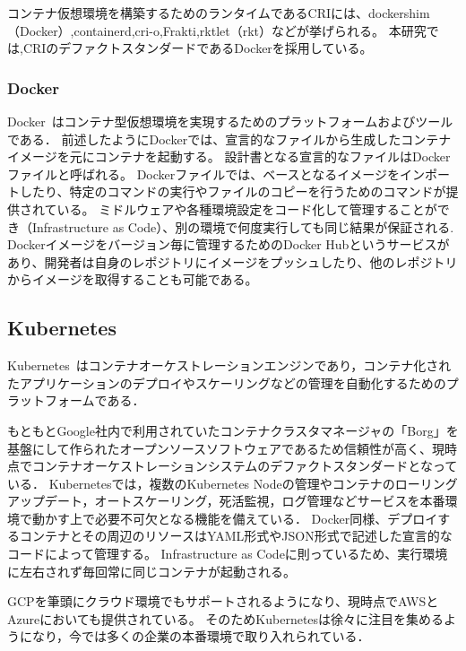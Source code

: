 コンテナ仮想環境を構築するためのランタイムであるCRIには、dockershim（Docker）,containerd,cri-o,Frakti,rktlet（rkt）などが挙げられる。
本研究では,CRIのデファクトスタンダードであるDockerを採用している。

\subsubsection{Docker}
\label{background:docker}

Docker~\cite{Docker}はコンテナ型仮想環境を実現するためのプラットフォームおよびツールである．
前述したようにDockerでは、宣言的なファイルから生成したコンテナイメージを元にコンテナを起動する。
設計書となる宣言的なファイルはDockerファイルと呼ばれる。
Dockerファイルでは、ベースとなるイメージをインポートしたり、特定のコマンドの実行やファイルのコピーを行うためのコマンドが提供されている。
ミドルウェアや各種環境設定をコード化して管理することができ（Infrastructure as Code）、別の環境で何度実行しても同じ結果が保証される.
Dockerイメージをバージョン毎に管理するためのDocker Hubというサービスがあり、開発者は自身のレポジトリにイメージをプッシュしたり、他のレポジトリからイメージを取得することも可能である。

\subsection{Kubernetes}
\label{background:kubernetes}

Kubernetes~\cite{Kubernetes}はコンテナオーケストレーションエンジンであり，コンテナ化されたアプリケーションのデプロイやスケーリングなどの管理を自動化するためのプラットフォームである．

もともとGoogle社内で利用されていたコンテナクラスタマネージャの「Borg」を基盤にして作られたオープンソースソフトウェアであるため信頼性が高く、現時点でコンテナオーケストレーションシステムのデファクトスタンダードとなっている．
Kubernetesでは，複数のKubernetes Nodeの管理やコンテナのローリングアップデート，オートスケーリング，死活監視，ログ管理などサービスを本番環境で動かす上で必要不可欠となる機能を備えている．
Docker同様、デプロイするコンテナとその周辺のリソースはYAML形式やJSON形式で記述した宣言的なコードによって管理する。
Infrastructure as Codeに則っているため、実行環境に左右されず毎回常に同じコンテナが起動される。

GCPを筆頭にクラウド環境でもサポートされるようになり、現時点でAWSとAzureにおいても提供されている。
そのためKubernetesは徐々に注目を集めるようになり，今では多くの企業の本番環境で取り入れられている．

